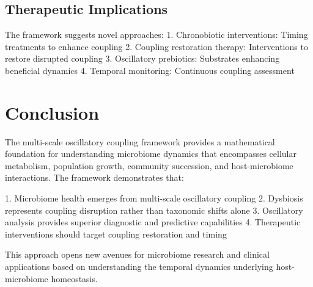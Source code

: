 \documentclass[twocolumn]{article}
\begin{document}
\subsection{Therapeutic Implications}

The framework suggests novel approaches:
1. Chronobiotic interventions: Timing treatments to enhance coupling
2. Coupling restoration therapy: Interventions to restore disrupted coupling
3. Oscillatory prebiotics: Substrates enhancing beneficial dynamics
4. Temporal monitoring: Continuous coupling assessment

\section{Conclusion}

The multi-scale oscillatory coupling framework provides a mathematical foundation for understanding microbiome dynamics that encompasses cellular metabolism, population growth, community succession, and host-microbiome interactions. The framework demonstrates that:

1. Microbiome health emerges from multi-scale oscillatory coupling
2. Dysbiosis represents coupling disruption rather than taxonomic shifts alone  
3. Oscillatory analysis provides superior diagnostic and predictive capabilities
4. Therapeutic interventions should target coupling restoration and timing

This approach opens new avenues for microbiome research and clinical applications based on understanding the temporal dynamics underlying host-microbiome homeostasis.



\end{document}
